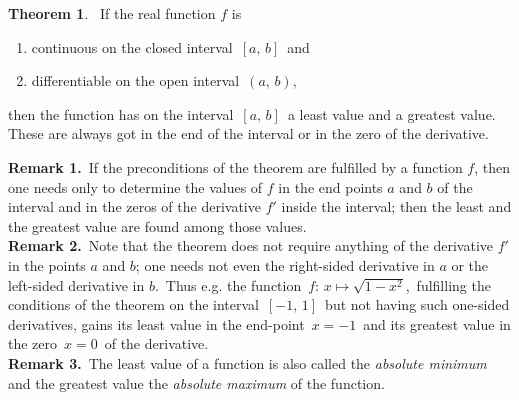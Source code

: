 \documentclass[12pt]{article}
\theoremstyle{definition}
\newtheorem*{thmplain}{Theorem}
\begin{document}
\begin{thmplain}
\, If the real function $f$ is
\begin{enumerate}
\item continuous on the closed interval\, $[a,\,b]$\, and
\item differentiable on the open interval\, $(a,\,b)$,
\end{enumerate}
then the function has on the interval\, $[a,\,b]$\, a least value and a greatest value.\, These are always got in the end of the interval or in the zero of the derivative.
\end{thmplain}

\textbf{Remark 1.}\, If the preconditions of the theorem are fulfilled by a function $f$, then one needs only to determine the values of $f$ in the end points $a$ and $b$ of the interval and in the zeros of the derivative $f'$ inside the interval; then the least and the greatest value are found among those values.\\

\textbf{Remark 2.}\, Note that the theorem does not require anything of the derivative $f'$ in the points $a$ and $b$; one needs not even the right-sided derivative in $a$ or the left-sided derivative in $b$.\, Thus e.g. the function\, $f:\,x \mapsto \sqrt{1-x^2}$,\, fulfilling the conditions of the theorem on the interval\, $[-1,\,1]$\, but not having such one-sided derivatives, gains its least value in the end-point\, $x = -1$\, and its greatest value in the zero\, $x = 0$\, of the derivative.\\

\textbf{Remark 3.}\, The least value of a function is also called the \emph{absolute minimum} and the greatest value the \emph{absolute maximum} of the function.
\end{document}
